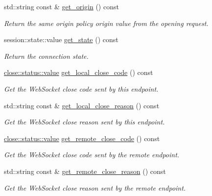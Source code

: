 \begin{DoxyCompactItemize}
std\+::string const  \& \mbox{\hyperlink{classwebsocketpp_1_1connection_a428a8ee0bd94a7dadf6a4831c756ead3}{get\+\_\+origin}} () const
\begin{DoxyCompactList}\small\item\em Return the same origin policy origin value from the opening request. \end{DoxyCompactList}\item 
session\+::state\+::value \mbox{\hyperlink{classwebsocketpp_1_1connection_a9001efbd5b467ccf3e5e601bb18e4971}{get\+\_\+state}} () const
\begin{DoxyCompactList}\small\item\em Return the connection state. \end{DoxyCompactList}\item 
\mbox{\hyperlink{namespacewebsocketpp_1_1close_1_1status_a8614a5c4733d708e2d2a32191c5bef84}{close\+::status\+::value}} \mbox{\hyperlink{classwebsocketpp_1_1connection_a871a1374bb7330126bfe3f535753cc52}{get\+\_\+local\+\_\+close\+\_\+code}} () const
\begin{DoxyCompactList}\small\item\em Get the Web\+Socket close code sent by this endpoint. \end{DoxyCompactList}\item 
std\+::string const  \& \mbox{\hyperlink{classwebsocketpp_1_1connection_a5ac5746742be51cc68c15a8cfaf962c8}{get\+\_\+local\+\_\+close\+\_\+reason}} () const
\begin{DoxyCompactList}\small\item\em Get the Web\+Socket close reason sent by this endpoint. \end{DoxyCompactList}\item 
\mbox{\hyperlink{namespacewebsocketpp_1_1close_1_1status_a8614a5c4733d708e2d2a32191c5bef84}{close\+::status\+::value}} \mbox{\hyperlink{classwebsocketpp_1_1connection_aad217d74120fb96a39d71c330e0ffa41}{get\+\_\+remote\+\_\+close\+\_\+code}} () const
\begin{DoxyCompactList}\small\item\em Get the Web\+Socket close code sent by the remote endpoint. \end{DoxyCompactList}\item 
std\+::string const  \& \mbox{\hyperlink{classwebsocketpp_1_1connection_a84cba269aca634a5e7729e88b13a44c7}{get\+\_\+remote\+\_\+close\+\_\+reason}} () const
\begin{DoxyCompactList}\small\item\em Get the Web\+Socket close reason sent by the remote endpoint. \end{DoxyCompactList}\item 

\end{DoxyCompactItemize}
